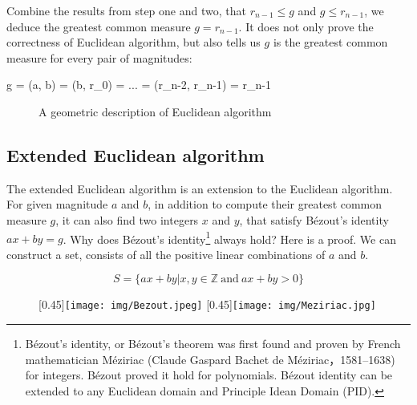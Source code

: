 \documentclass{article}
\begin{document}
Combine the results from step one and two, that $r_{n-1} \leq g$ and $g \leq r_{n-1}$, we deduce the greatest common measure $g = r_{n-1}$. It does not only prove the correctness of Euclidean algorithm, but also tells us $g$ is the greatest common measure for every pair of magnitudes:

\be
g = \gcm(a, b) = \gcm(b, r_0) = ... = \gcm(r_{n-2}, r_{n-1}) = r_{n-1}
\label{eq:recursive-gcm}
\ee

\begin{figure}[htbp]
 \centering
 \captionsetup{labelformat=empty}
 \caption{A geometric description of Euclidean algorithm}
 \label{fig:geometric-GCM}
\end{figure}

\subsection{Extended Euclidean algorithm}

The extended Euclidean algorithm is an extension to the Euclidean algorithm. For given magnitude $a$ and $b$, in addition to compute their greatest common measure $g$, it can also find two integers $x$ and $y$, that satisfy Bézout's identity $ax + by = g$. Why does Bézout's identity\footnote{Bézout's identity, or Bézout's theorem was first found and proven by French mathematician Méziriac (Claude Gaspard Bachet de Méziriac，1581–1638) for integers. Bézout proved it hold for polynomials. Bézout identity can be extended to any Euclidean domain and Principle Idean Domain (PID).} always hold? Here is a proof. We can construct a set, consists of all the positive linear combinations of $a$ and $b$.

\[
S = \{ ax + by | x, y \in \mathbb{Z}\ \text{and} \ ax + by > 0\}
\]

\begin{figure}[htbp]
 \centering
 [0.45\linewidth]{\texttt{[image: img/Bezout.jpeg]}}
 [0.45\linewidth]{\texttt{[image: img/Meziriac.jpg]}}
 \captionsetup{labelformat=empty}
 \caption{}
 \label{fig:Bezout}
 \label{fig:Meziriac}
\end{figure}
\end{document}
